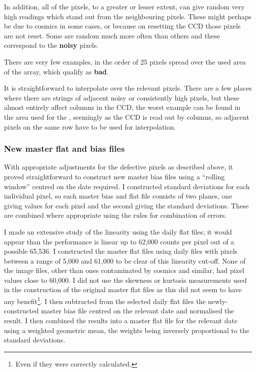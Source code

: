 In addition, all of the pixels, to a greater or lesser extent, can give random
very high readings which stand out from the neighbouring pixels. These might
perhaps be due to cosmics in some cases, or because on resetting the CCD those
pixels are not reset. Some are random much more often than others and these
correspond to the \textbf{noisy} pixels.

There are very few examples, in the order of 25 pixels spread over the used area
of the array, which qualify as \textbf{bad}.

It is straightforward to interpolate over the relevant pixels. There are a few
places where there are strings of adjacent noisy or consistently high pixels,
but these almost entirely affect columns in the CCD, the worst example can be
found in the area used for the \gfilter, seemingly as the CCD is read out by
columns, so adjacent pixels on the same row have to be used for interpolation.

\subsubsection{New master flat and bias files}
\protect\label{section:newmastfb}

With appropriate adjustments for the defective pixels as described above, it
proved straightforward to construct new master bias files using a  ``rolling
window'' centred on the date required. I constructed standard deviations for
each individual pixel, so each master bias and flat file consists of two planes,
one giving values for each pixel and the second giving the standard deviations.
These are combined where appropriate using the rules for combination of errors.

I made an extensive study of the linearity using the daily flat files; it would 
appear than the performance is linear up to 62,000 counts per pixel out of a
possible 65,536. I constructed the master flat files using daily files with
pixels between a range of 5,000 and 61,000 to be clear of this linearity
cut-off.
None of the image files, other than ones contaminated by cosmics and similar,
had pixel values close to 60,000. I did not use the skewness or kurtosis
measurements used in the construction of the original master flat files as this
did not seem to have any benefit\footnote{Even if they were correctly
calculated.}. I then subtracted from the selected daily flat files the
newly-constructed master bias file centred on the relevant date and normalised
the result.
I then combined the results into a master flat file for the relevant date using
a weighted geometric mean, the weights being inversely proportional to the
standard deviations.

